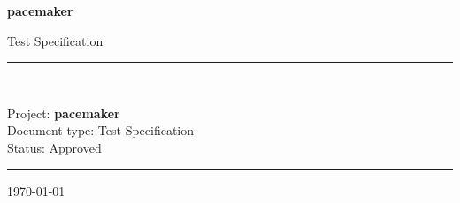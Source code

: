 \begin{titlepage}
  \centering
  \vspace*{3cm}
  {\Huge\bfseries\color{testred} pacemaker\par}
  \vspace{0.5cm}
  {\Large Test Specification\par}
  \vspace{1.5cm}
  \rule{\linewidth}{0.5pt}\\[0.4cm]
  {\large Project: \textbf{pacemaker}\\
         Document type: Test Specification\\
         Status: Approved\par}
  \rule{\linewidth}{0.5pt}
  \vfill
  {\small\today}
\end{titlepage}

\tableofcontents
\newpage

